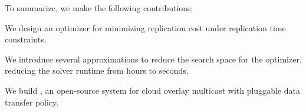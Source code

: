 
\vspace{0.5em}
To summarize, we make the following contributions: 
\begin{compactenum}
    
    \item We design an optimizer for minimizing replication cost under replication time constraints. 
    \item We introduce several approximations to reduce the search space for the optimizer, reducing the solver runtime from hours to seconds.
    
    \item We build \sys, an open-source system for cloud overlay multicast with pluggable data transfer policy.
\end{compactenum}




